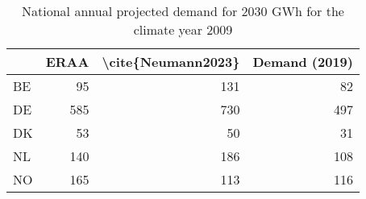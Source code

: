 \begin{table}
\centering
\caption{National annual projected demand for 2030  GWh for the climate year 2009}
\begin{tabular}{lrrr}
\toprule
{} &  ERAA &  \textbackslash cite\{Neumann2023\} &  Demand (2019) \\
\midrule
BE &    95 &                 131 &             82 \\
DE &   585 &                 730 &            497 \\
DK &    53 &                  50 &             31 \\
NL &   140 &                 186 &            108 \\
NO &   165 &                 113 &            116 \\
\bottomrule
\end{tabular}
\end{table}
